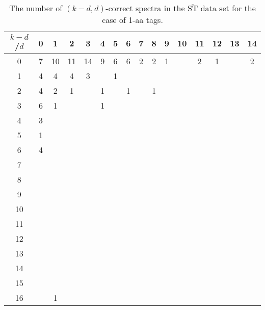 \documentclass{article}[12pt]
\def\STbar{{\overline{\mathrm{ST}}}}
\begin{document}
\begin{landscape}

\begin{table}[h]\footnotesize
{\centering
\begin{tabular}{|c|c|
c|c|c|c|c|c|c|c|c|c|c|c|c|c|}
  \hline
  $k-d$/$d$ 
 & 0 & 1 & 2 & 3 & 4 & 5 & 6 & 7 & 8 & 9 & 10 & 11 & 12 & 13 & 14\\

  \hline
  \hline

0  & 7 & 10 & 11 & 14 & 9 & 6 & 6 & 2 & 2 & 1 &  & 2 & 1 &  & 2\\

1  & 4 & 4 & 4 & 3 &  & 1 &  &  &  &  &  &  &  &  & \\

2  & 4 & 2 & 1 &  & 1 &  & 1 &  & 1 &  &  &  &  &  & \\

3  & 6 & 1 &  &  & 1 &  &  &  &  &  &  &  &  &  & \\

4  & 3 &  &  &  &  &  &  &  &  &  &  &  &  &  & \\

5  & 1 &  &  &  &  &  &  &  &  &  &  &  &  &  & \\

6  & 4 &  &  &  &  &  &  &  &  &  &  &  &  &  & \\

7  &  &  &  &  &  &  &  &  &  &  &  &  &  &  & \\

8  &  &  &  &  &  &  &  &  &  &  &  &  &  &  & \\

9  &  &  &  &  &  &  &  &  &  &  &  &  &  &  & \\

10  &  &  &  &  &  &  &  &  &  &  &  &  &  &  & \\

11  &  &  &  &  &  &  &  &  &  &  &  &  &  &  & \\

12  &  &  &  &  &  &  &  &  &  &  &  &  &  &  & \\

13  &  &  &  &  &  &  &  &  &  &  &  &  &  &  & \\

14  &  &  &  &  &  &  &  &  &  &  &  &  &  &  & \\

15  &  &  &  &  &  &  &  &  &  &  &  &  &  &  & \\

16  &  & 1 &  &  &  &  &  &  &  &  &  &  &  &  & \\

  \hline
\end{tabular}
\par}
\centering
\caption{The number of $(k-d,d)$-correct spectra in the $\STbar$ data set for the case of 1-aa tags.}
\vspace{3mm}
\label{table:kd-1-correct-ST-bar}
\end{table}
\end{landscape}
\end{document}
